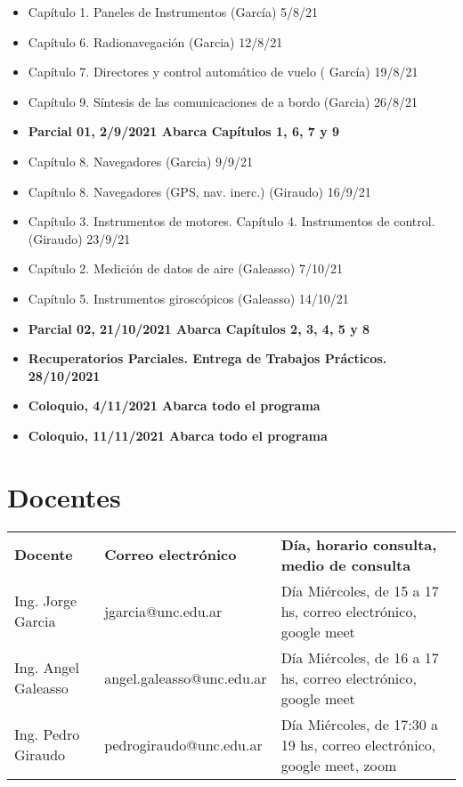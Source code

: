   \begin{itemize}
  \item Capítulo 1. Paneles de Instrumentos (García) 5/8/21
  \item Capítulo 6. Radionavegación (Garcia) 12/8/21 
  \item Capítulo 7. Directores y control automático de vuelo ( García)   19/8/21
  \item Capítulo 9. Síntesis de las comunicaciones de a bordo (Garcia)   26/8/21

  \item \textbf{Parcial 01,  2/9/2021 Abarca Capítulos 1, 6, 7 y 9}

  \item Capítulo 8. Navegadores (Garcia) 9/9/21
  \item Capítulo 8. Navegadores (GPS, nav. inerc.) (Giraudo) 16/9/21

  \item Capítulo 3. Instrumentos de motores.
	Capítulo 4. Instrumentos de control.          (Giraudo) 23/9/21

  \item Capítulo 2. Medición de datos de aire (Galeasso) 7/10/21
  \item Capítulo 5. Instrumentos giroscópicos (Galeasso) 14/10/21

  \item {\bf Parcial 02,  21/10/2021 Abarca Capítulos 2, 3, 4, 5 y  8}
  \item \textbf{Recuperatorios Parciales. Entrega de Trabajos Prácticos. 28/10/2021}

  \item \textbf{Coloquio,  4/11/2021 Abarca todo el programa}
  \item \textbf{Coloquio, 11/11/2021 Abarca todo el programa}
  \end{itemize}


\section*{Docentes}
\label{00.docentes}

  \begin{tabular}{llm{}} \rowcolor{yellow!30}
 {\bf Docente} & {\bf Correo electr\'onico} & {\bf D\'ia, horario consulta, medio de consulta} \\ \rowcolor{cyan!20}
  Ing. Jorge Garcia & jgarcia@unc.edu.ar & D\'ia Mi\'ercoles, de 15 a 17 hs, correo electr\'onico, google meet \\ 
  Ing. Angel Galeasso & angel.galeasso@unc.edu.ar & D\'ia Mi\'ercoles, de 16 a 17 hs, correo electr\'onico, google meet    \\ \rowcolor{cyan!20} 
  Ing. Pedro Giraudo  & pedrogiraudo@unc.edu.ar &  D\'ia Mi\'ercoles, de 17:30 a 19 hs, correo electr\'onico, google meet, zoom     \\
\end{tabular}